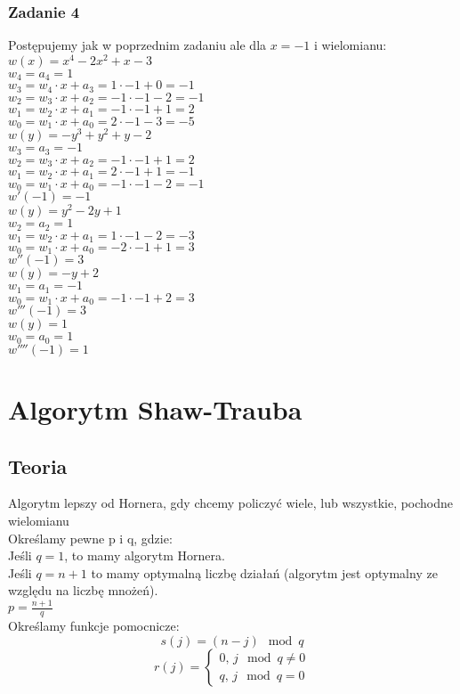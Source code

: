 \documentclass[a4paper]{article}
\begin{document}
\subsubsection*{Zadanie 4}
Postępujemy jak w poprzednim zadaniu ale dla $x=-1$ i wielomianu:\\
$w(x)=x^4-2x^2+x-3$\\
$w_4 = a_4 = 1$\\
$w_3 = w_4 \cdot x + a_3 = 1 \cdot -1 + 0 = -1$\\
$w_2 = w_3 \cdot x + a_2 = -1 \cdot -1 - 2 = -1$\\
$w_1 = w_2 \cdot x + a_1 = -1 \cdot -1 + 1 = 2$\\
$w_0 = w_1 \cdot x + a_0 = 2 \cdot -1 - 3 = -5$\\
$w(y) = -y^3 + y^2 + y - 2$\\
$w_3 = a_3 = -1$\\
$w_2 = w_3 \cdot x + a_2 = -1 \cdot -1 + 1 = 2$\\
$w_1 = w_2 \cdot x + a_1 = 2 \cdot -1 + 1 = -1$\\
$w_0 = w_1 \cdot x + a_0 = -1 \cdot -1 - 2 = -1$\\
$w'(-1) = -1$ \\
$w(y) = y^2 - 2y + 1$\\
$w_2 = a_2 = 1$\\
$w_1 = w_2 \cdot x + a_1 = 1 \cdot -1 - 2 = -3$\\
$w_0 = w_1 \cdot x + a_0 = -2 \cdot -1 + 1 = 3$\\
$w''(-1) = 3$\\
$w(y) = -y + 2$\\
$w_1 = a_1 = -1$\\
$w_0 = w_1 \cdot x + a_0 = -1 \cdot -1 + 2 = 3$\\
$w'''(-1) = 3$\\
$w(y) = 1$\\
$w_0 = a_0 = 1$\\
$w''''(-1) = 1$

\section{Algorytm Shaw-Trauba}
\subsection{Teoria}
Algorytm lepszy od Hornera, gdy chcemy policzyć wiele, lub wszystkie, pochodne wielomianu\\
Określamy pewne p i q, gdzie: \\
Jeśli $q = 1$, to mamy algorytm Hornera.\\
Jeśli $q = n+1$ to mamy optymalną liczbę działań (algorytm jest optymalny ze względu na liczbę mnożeń).\\
$p=\frac{n+1}{q}$\\
Określamy funkcje pomocnicze:
$$ s(j) = (n-j)\mod q $$
$$ r(j) = \begin{cases} 0\text{,\ \ } j\mod q \neq 0 \\ q\text{,\ \ } j\mod q = 0 \end{cases} $$\\
\end{document}
